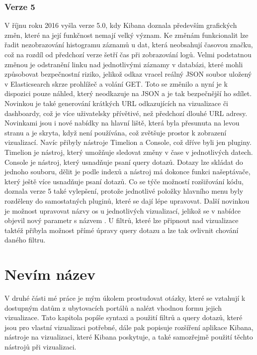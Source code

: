 \documentclass[czech,BP]{thesiskiv}
\begin{document}
 \subsection{Verze 5}
 V říjnu roku 2016 vyšla verze 5.0, kdy Kibana doznala především grafických změn, které na její funkčnost nemají velký význam. Ke změnám funkcionalit lze řadit nezobrazování histogramu záznamů u dat, která neobsahují časovou značku, což na rozdíl od předchozí verze šetří čas při zobrazování logů. Velmi podstatnou změnou je odstranění linku nad jednotlivými záznamy v databázi, které mohli způsobovat bezpečnostní riziko, jelikož odkaz vracel reálný JSON soubor uložený v Elasticsearch skrze prohlížeč a volání GET. Toto se změnilo a nyní je k dispozici pouze náhled, který neodkazuje na JSON a je tak bezpečnější ho sdílet. Novinkou je také generování krátkých URL odkazujících na vizualizace či dashboardy, což je více uživatelsky přívětivé, než předchozí dlouhé URL adresy. Novinkami jsou i nové nabídky na hlavní liště, která byla přesunuta na levou stranu a je skryta, když není používána, což zvětšuje prostor k zobrazení vizualizací. Navíc přibyly nástroje Timelion a Console, což dříve byli jen pluginy. Timelion je nástroj, který umožňuje sledovat změny v čase v jednotlivých datech. Console je nástroj, který usnadňuje psaní query dotazů. Dotazy lze skládat do jednoho souboru, dělit je podle indexů a nástroj má dokonce funkci našeptávače, který ještě více usnadňuje psaní dotazů. Co se týče možností rozšiřování kódu, doznala verze 5 také vylepšení, protože jednotlivé položky hlavního menu byly rozděleny do samostatných pluginů, které se dají lépe upravovat. Další novinkou je možnost upravovat názvy os u jednotlivých vizualizací, jelikož se v nabídce objevil nový parametr s názvem . U filtrů, které lze připnout nad vizualizace taktéž přibyla možnost přímé úpravy query dotazu a lze tak ovlivnit chování daného filtru. \cite{Kibana5intro}
 
 
\chapter{Nevím název}
V druhé části mé práce je mým úkolem prostudovat otázky, které se vztahují k dostupným datům z ubytovacích portálů a nalézt vhodnou formu jejich vizualizace. Tato kapitola popíše syntaxi a použití filtrů a query dotazů, které jsou pro vlastní vizualizaci potřebné, dále pak popisuje rozšíření aplikace Kibana, nástroje na vizualizaci, které Kibana poskytuje, a také samozřejmě použití těchto nástrojů při vizualizaci.
\end{document}
